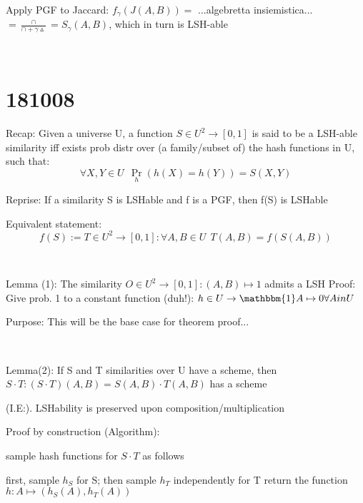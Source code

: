 \documentclass{report}
\begin{document}
	
	Apply PGF to Jaccard: $f_\gamma (J(A, B)) = $ ...algebretta insiemistica... $= \frac{\cap}{\cap + \gamma\vartriangle} = S_\gamma(A, B)$, which in turn is LSH-able
	
	
	\
	
	\section{181008}
	
	
	
	Recap: Given a universe U, a function $S \in U^2 \to [0, 1]$ is said to be a LSH-able similarity iff exists prob distr over (a family/subset of) the hash functions in U, such that: 
	\begin{equation}
	\forall X, Y \in U\ \ \Pr_h(h(X)=h(Y)) = S(X, Y)
	\end{equation}
	
	
	Reprise: If a similarity S is LSHable and f is a PGF, then f(S) is LSHable
	
	Equivalent statement:
	\begin{equation}
	f(S) := T \in U^2 \to [0, 1] : \forall A, B \in U\ \ T(A, B) = f(S(A, B))
	\end{equation}
	
	
	
	
	\
	
	Lemma (1): The similarity $O \in U^2 \to [0, 1] : (A, B) \mapsto 1$ admits a LSH
	Proof: Give prob. 1 to a constant function (duh!): $h \in U \to \mathbbm{1} A \mapsto 0 \forall A in U$
	
	Purpose: This will be the base case for theorem proof...
	
	
	\
	
	Lemma(2): If S and T similarities over U have a scheme, then $S \cdot T : (S \cdot T)(A, B) = S(A, B)\cdot T(A, B)$ has a scheme
	
	(I.E:). LSHability is preserved upon composition/multiplication
	
	Proof by construction (Algorithm): 
	
	sample hash functions for $S \cdot T$ as follows
	
	first, sample $h_S$ for S;
	then sample $h_T$ independently for T
	return the function $h : A \mapsto (h_S(A), h_T(A))$
	
\end{document}
